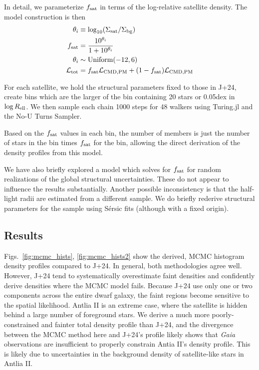 In detail, we parameterize \(f_{\rm sat}\) in terms of the log-relative
satellite density. The model construction is then \begin{equation}{
\begin{align}
\theta_i &\equiv \log_{10}({\Sigma_{\rm sat}}/{\Sigma_{\rm bg}}) \\
f_{\rm sat} &= \frac{10^{\theta_i}}{1 + 10^{\theta_i}} \\
\theta_i &\sim {\rm Uniform}(-12, 6) \\
{\cal L}_{\rm tot} &= f_{\rm sat}{\cal L}_{\rm CMD, PM} + (1-f_{\rm sat}){\cal L}_{\rm CMD, PM} \\
\end{align}
}\end{equation}

For each satellite, we hold the structural parameters fixed to those in
J+24, create bins which are the larger of the bin containing 20 stars or
0.05dex in \(\log R_{\rm ell}\). We then sample each chain 1000 steps
for 48 walkers using Turing.jl and the No-U Turns Sampler.

Based on the \(f_{\rm sat}\) values in each bin, the number of members
is just the number of stars in the bin times \(f_{\rm sat}\) for the
bin, allowing the direct derivation of the density profiles from this
model.

We have also briefly explored a model which solves for \(f_{\rm sat}\)
for random realizations of the global structural uncertainties. These do
not appear to influence the results substantially. Another possible
inconsistency is that the half-light radii are estimated from a
different sample. We do briefly rederive structural parameters for the
sample using Sérsic fits (although with a fixed origin).

\subsection{Results}\label{results}

Figs.~\ref{fig:mcmc_hists}, \ref{fig:mcmc_hists2} show the derived, MCMC
histogram density profiles compared to J+24. In general, both
methodologies agree well. However, J+24 tend to systematically
overestimate faint densities and confidently derive densities where the
MCMC model fails. Because J+24 use only one or two components across the
entire dwarf galaxy, the faint regions become sensitive to the spatial
likelihood. Antlia II is an extreme case, where the satellite is hidden
behind a large number of foreground stars. We derive a much more
poorly-constrained and fainter total density profile than J+24, and the
divergence between the MCMC method here and J+24's profile likely shows
that \emph{Gaia} observations are insufficient to properly constrain
Antia II's density profile. This is likely due to uncertainties in the
background density of satellite-like stars in Antlia II.

